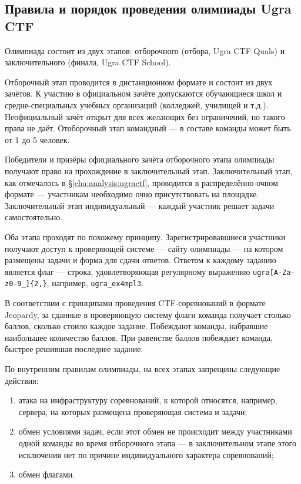 \subsection{Правила и порядок проведения олимпиады Ugra CTF}

Олимпиада состоит из двух этапов: отборочного (отбора, Ugra CTF Quals) и заключительного (финала, Ugra CTF School).

Отборочный этап проводится в дистанционном формате и состоит из двух зачётов. К участию в официальном зачёте допускаются обучающиеся школ и средне-специальных учебных организаций (колледжей, училищей и т.д.). Неофициальный зачёт открыт для всех желающих без ограничений, но такого права не даёт. Отоборочный этап командный — в составе команды может быть от 1 до 5 человек.

Победители и призёры официального зачёта отборочного этапа олимпиады получают право на прохождение в заключительный этап. Заключительный этап, как отмечалось в §\ref{cha:analysis:ugractf}, проводится в распределённо-очном формате — участникам необходимо очно присутствовать на площадке. Заключительный этап индивидуальный — каждый участник решает задачи самостоятельно.

Оба этапа проходят по похожему принципу. Зарегистрировавшиеся участники получают доступ к проверяющей системе — сайту олимпиады — на котором размещены задачи и форма для сдачи ответов. Ответом к каждому заданию является флаг — строка, удовлетворяющая регулярному выражению \texttt{ugra[A-Za-z0-9\_]\{2,\}}, например, \texttt{ugra\_ex4mpl3}.


В соответствии с принципами проведения CTF-соревнований в формате Jeopardy, за сданные в проверяющую систему флаги команда получает столько баллов, сколько стоило каждое задание. Побеждают команды, набравшие наибольшее количество баллов. При равенстве баллов побеждает команда, быстрее решившая последнее задание.

По внутренним правилам олимпиады, на всех этапах запрещены следующие действия:
\begin{enumerate}
\item атака на инфраструктуру соревнований, к которой относятся, например, сервера, на которых размещена проверяющая система и задачи;
\item обмен условиями задач, если этот обмен не происходит между участниками одной команды во время отборочного этапа — в заключительном этапе этого исключения нет по причине индивидуального характера соревнований;
\item обмен флагами.
\end{enumerate}

